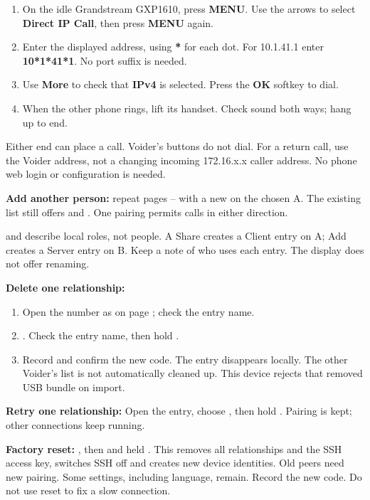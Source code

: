 \emergency
{}
\begin{enumerate}
\item On the idle Grandstream GXP1610, press \textbf{MENU}. Use the arrows to select \textbf{Direct IP Call}, then press \textbf{MENU} again.
\item Enter the displayed address, using \textbf{*} for each dot. For 10.1.41.1 enter \textbf{10*1*41*1}. No port suffix is needed.
\item Use \textbf{More} to check that \textbf{IPv4} is selected. Press the \textbf{OK} softkey to dial.
\item When the other phone rings, lift its handset. Check sound both ways; hang up to end.
\end{enumerate}
Either end can place a call. Voider's buttons do not dial. For a return call, use the Voider address, not a changing incoming 172.16.x.x caller address. No phone web login or configuration is needed.

\textbf{Add another person:} repeat pages \pageref{en:share}–\pageref{en:add} with a new  on the chosen A. The existing list still offers  and . One pairing permits calls in either direction.

 and  describe local roles, not people. A Share creates a Client entry on A; Add creates a Server entry on B. Keep a note of who uses each entry. The display does not offer renaming.

\textbf{Delete one relationship:}
\begin{enumerate}
\item Open the number as on page \pageref{en:find}; check the entry name.
\item {} \arr {}. Check the entry name, then hold .
\item Record and confirm the new code. The entry disappears locally. The other Voider's list is not automatically cleaned up. This device rejects that removed USB bundle on import.
\end{enumerate}

\textbf{Retry one relationship:} Open the entry, choose  \arr {}, then hold . Pairing is kept; other connections keep running.

\textbf{Factory reset:}  \arr {} \arr {} \arr {}, then  and held . This removes all relationships and the SSH access key, switches SSH off and creates new device identities. Old peers need new pairing. Some settings, including language, remain. Record the new code. Do not use reset to fix a slow connection.

